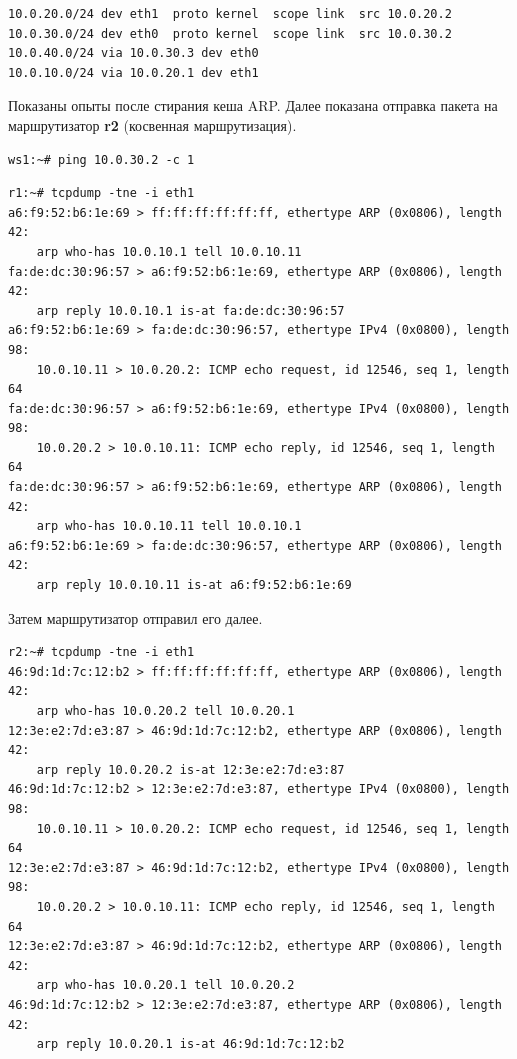 \documentclass[a4paper,12pt]{article}
\begin{document}
\begin{Verbatim}
10.0.20.0/24 dev eth1  proto kernel  scope link  src 10.0.20.2 
10.0.30.0/24 dev eth0  proto kernel  scope link  src 10.0.30.2 
10.0.40.0/24 via 10.0.30.3 dev eth0 
10.0.10.0/24 via 10.0.20.1 dev eth1 
\end{Verbatim}

Показаны опыты после стирания кеша ARP.
Далее показана отправка пакета на маршрутизатор \textbf{r2} (косвенная маршрутизация). 

\begin{Verbatim}
ws1:~# ping 10.0.30.2 -c 1
\end{Verbatim}

\begin{Verbatim}
r1:~# tcpdump -tne -i eth1
a6:f9:52:b6:1e:69 > ff:ff:ff:ff:ff:ff, ethertype ARP (0x0806), length 42: 
	arp who-has 10.0.10.1 tell 10.0.10.11
fa:de:dc:30:96:57 > a6:f9:52:b6:1e:69, ethertype ARP (0x0806), length 42: 
	arp reply 10.0.10.1 is-at fa:de:dc:30:96:57
a6:f9:52:b6:1e:69 > fa:de:dc:30:96:57, ethertype IPv4 (0x0800), length 98: 
	10.0.10.11 > 10.0.20.2: ICMP echo request, id 12546, seq 1, length 64
fa:de:dc:30:96:57 > a6:f9:52:b6:1e:69, ethertype IPv4 (0x0800), length 98: 
	10.0.20.2 > 10.0.10.11: ICMP echo reply, id 12546, seq 1, length 64
fa:de:dc:30:96:57 > a6:f9:52:b6:1e:69, ethertype ARP (0x0806), length 42: 
	arp who-has 10.0.10.11 tell 10.0.10.1
a6:f9:52:b6:1e:69 > fa:de:dc:30:96:57, ethertype ARP (0x0806), length 42: 
	arp reply 10.0.10.11 is-at a6:f9:52:b6:1e:69
\end{Verbatim}

Затем маршрутизатор отправил его далее.

\begin{Verbatim}
r2:~# tcpdump -tne -i eth1
46:9d:1d:7c:12:b2 > ff:ff:ff:ff:ff:ff, ethertype ARP (0x0806), length 42: 
	arp who-has 10.0.20.2 tell 10.0.20.1
12:3e:e2:7d:e3:87 > 46:9d:1d:7c:12:b2, ethertype ARP (0x0806), length 42: 
	arp reply 10.0.20.2 is-at 12:3e:e2:7d:e3:87
46:9d:1d:7c:12:b2 > 12:3e:e2:7d:e3:87, ethertype IPv4 (0x0800), length 98:
	10.0.10.11 > 10.0.20.2: ICMP echo request, id 12546, seq 1, length 64
12:3e:e2:7d:e3:87 > 46:9d:1d:7c:12:b2, ethertype IPv4 (0x0800), length 98: 
	10.0.20.2 > 10.0.10.11: ICMP echo reply, id 12546, seq 1, length 64
12:3e:e2:7d:e3:87 > 46:9d:1d:7c:12:b2, ethertype ARP (0x0806), length 42: 
	arp who-has 10.0.20.1 tell 10.0.20.2
46:9d:1d:7c:12:b2 > 12:3e:e2:7d:e3:87, ethertype ARP (0x0806), length 42: 
	arp reply 10.0.20.1 is-at 46:9d:1d:7c:12:b2

\end{Verbatim}
\end{document}

